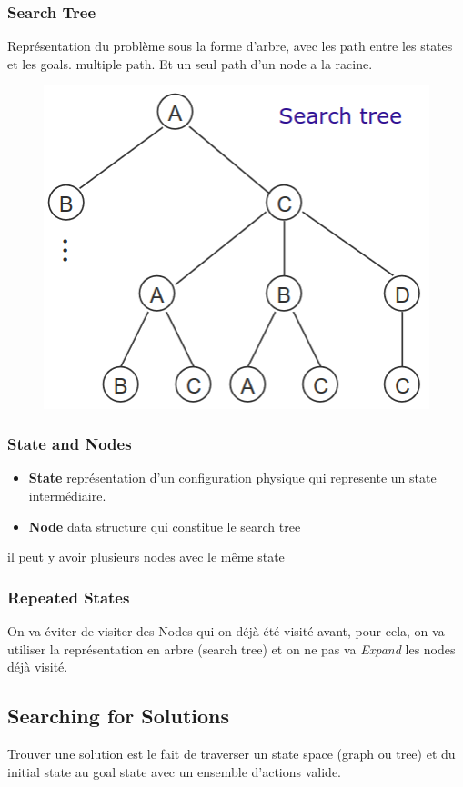 		\subsubsection{Search Tree}
			Représentation du problème sous la forme d'arbre, avec les path entre les states et les goals. multiple path. Et un seul path d'un node a la racine.
			\begin{figure}[htp]
				\centering
				\includegraphics[width=.5\textwidth]{img/SearchTree.png}
			\end{figure}
			
		\subsubsection{State and Nodes}
			\begin{itemize}
				\item \textbf{State} représentation d'un configuration physique qui represente un state intermédiaire.
				\item \textbf{Node} data structure qui constitue le search tree
			\end{itemize}
			il peut y avoir plusieurs nodes avec le même state
		\subsubsection{Repeated States}
			On va éviter de visiter des Nodes qui on déjà été visité avant, pour cela, on va utiliser la représentation en arbre (search tree) et on ne pas va \textit{Expand} les nodes déjà visité.
	\subsection{Searching for Solutions}
		Trouver une solution est le fait de traverser un state space (graph ou tree) et du initial state au goal state avec un ensemble d'actions valide.


